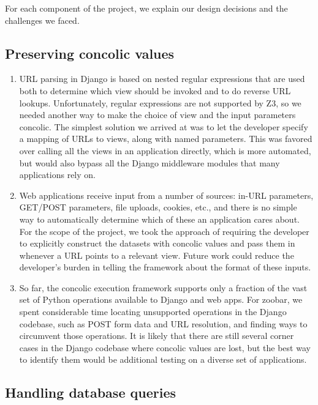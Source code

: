 \documentclass{scrartcl}
\begin{document}
For each component of the project, we explain our design decisions
and the challenges we faced.

\subsection{Preserving concolic values}

\begin{enumerate}
\item URL parsing in Django is based on nested regular expressions
  that are used both to determine which view should be invoked and to do reverse URL
lookups.
  Unfortunately, regular expressions are not supported by Z3, so we
  needed another way to make the choice of view and the input
  parameters concolic. The simplest solution we arrived at was to
  let the developer specify a mapping of URLs to views, along with
  named parameters. This was favored over calling all the views in an
  application directly, which is more automated, but would also
  bypass all the Django middleware modules that many applications
  rely on.

\item Web applications receive input from a number of sources: in-URL
  parameters, GET/POST parameters, file uploads, cookies, etc., and
  there is no simple way to automatically determine which of these an
  application cares about. For the scope of the project, we took the
  approach of requiring the developer to explicitly construct the
  datasets with concolic values and pass them in whenever a URL points
  to a relevant view. Future work could reduce the developer's burden
  in telling the framework about the format of these inputs.

\item So far, the concolic execution framework supports only a
  fraction of the vast set of Python operations available to Django
  and web apps. For zoobar, we spent considerable time locating
  unsupported operations in the Django codebase, such as POST form
  data and URL resolution, and finding ways to circumvent those
  operations. It is likely that there are still several corner cases
  in the Django codebase where concolic values are lost, but the best
  way to identify them would be additional testing on a diverse set of
  applications.
\end{enumerate}

\subsection{Handling database queries}
\end{document}
